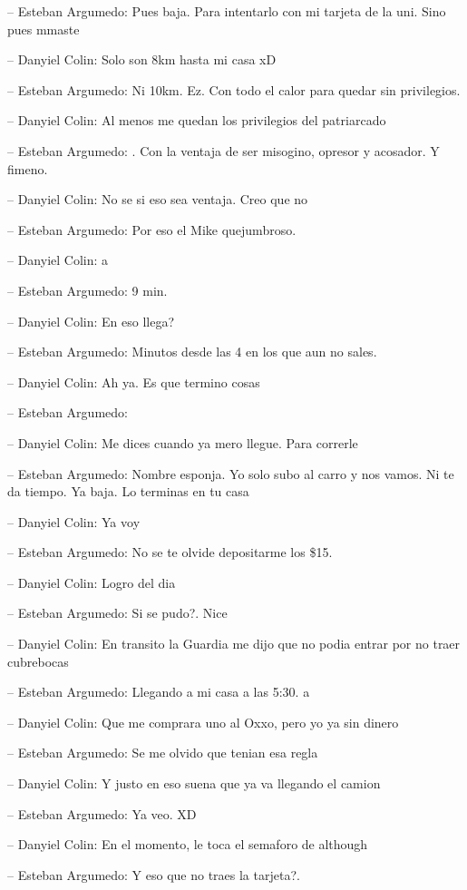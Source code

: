 -- Esteban Argumedo: Pues baja. Para intentarlo con mi tarjeta de la
uni. Sino pues mmaste

-- Danyiel Colin: Solo son 8km hasta mi casa xD

-- Esteban Argumedo: Ni 10km. Ez. Con todo el calor para quedar sin
privilegios.

-- Danyiel Colin: Al menos me quedan los privilegios del patriarcado

-- Esteban Argumedo: . Con la ventaja de ser misogino, opresor y
acosador. Y fimeno.

-- Danyiel Colin: No se si eso sea ventaja. Creo que no

-- Esteban Argumedo: Por eso el Mike quejumbroso.

-- Danyiel Colin: a

-- Esteban Argumedo: 9 min.

-- Danyiel Colin: En eso llega?

-- Esteban Argumedo: Minutos desde las 4 en los que aun no sales.

-- Danyiel Colin: Ah ya. Es que termino cosas

-- Esteban Argumedo:

-- Danyiel Colin: Me dices cuando ya mero llegue. Para correrle

-- Esteban Argumedo: Nombre esponja. Yo solo subo al carro y nos vamos.
Ni te da tiempo. Ya baja. Lo terminas en tu casa

-- Danyiel Colin: Ya voy

-- Esteban Argumedo: No se te olvide depositarme los \$15.

-- Danyiel Colin: Logro del dia

-- Esteban Argumedo: Si se pudo?. Nice

-- Danyiel Colin: En transito la Guardia me dijo que no podia entrar por
no traer cubrebocas

-- Esteban Argumedo: Llegando a mi casa a las 5:30. a

-- Danyiel Colin: Que me comprara uno al Oxxo, pero yo ya sin dinero

-- Esteban Argumedo: Se me olvido que tenian esa regla

-- Danyiel Colin: Y justo en eso suena que ya va llegando el camion

-- Esteban Argumedo: Ya veo. XD

-- Danyiel Colin: En el momento, le toca el semaforo de although

-- Esteban Argumedo: Y eso que no traes la tarjeta?.

